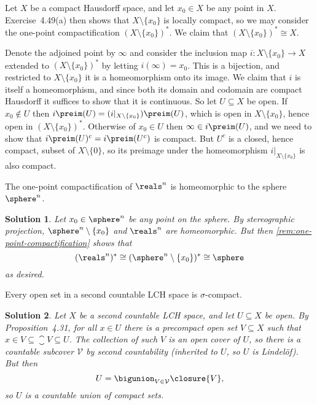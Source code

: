 \documentclass[article, a4paper, 11pt, oneside]{memoir}
\numberwithin{equation}{chapter}
\newcommand{\calV}{\mathcal{V}}
\theoremstyle{nonumberplain}
\newtheorem{solution}{Solution}
\begin{document}
\begin{remark}
	\label{rem:one-point-compactification}
	Let $X$ be a compact Hausdorff space, and let $x_0 \in X$ be any point in $X$. Exercise~4.49(a) then shows that $X \setminus \{x_0\}$ is locally compact, so we may consider the one-point compactification $(X \setminus \{x_0\})^*$. We claim that $(X \setminus \{x_0\})^* \cong X$.
	
	Denote the adjoined point by $\infty$ and consider the inclusion map $i \colon X \setminus \{x_0\} \to X$ extended to $(X \setminus \{x_0\})^*$ by letting $i(\infty) = x_0$. This is a bijection, and restricted to $X \setminus \{x_0\}$ it is a homeomorphism onto its image. We claim that $i$ is itself a homeomorphism, and since both its domain and codomain are compact Hausdorff it suffices to show that it is continuous. So let $U \subseteq X$ be open. If $x_0 \not\in U$ then $i\preim(U) = (i|_{X \setminus \{x_0\}})\preim(U)$, which is open in $X \setminus \{x_0\}$, hence open in $(X \setminus \{x_0\})^*$. Otherwise of $x_0 \in U$ then $\infty \in i\preim(U)$, and we need to show that $i\preim(U)^c = i\preim(U^c)$ is compact. But $U^c$ is a closed, hence compact, subset of $X \setminus \{0\}$, so its preimage under the homeomorphism $i|_{X \setminus \{x_0\}}$ is also compact.
\end{remark}


\begin{exerciseframed*}[52]
	The one-point compactification of $\reals^n$ is homeomorphic to the sphere $\sphere^n$.
\end{exerciseframed*}

\begin{solution}
	Let $x_0 \in \sphere^n$ be any point on the sphere. By stereographic projection, $\sphere^n \setminus \{x_0\}$ and $\reals^n$ are homeomorphic. But then \cref{rem:one-point-compactification} shows that
	\begin{equation*}
		(\reals^n)^*
			\cong (\sphere^n \setminus \{x_0\})^*
			\cong \sphere
	\end{equation*}
	as desired.
\end{solution}


\begin{exerciseframed*}[55]
	Every open set in a second countable LCH space is $\sigma$-compact.
\end{exerciseframed*}

\begin{solution}
	Let $X$ be a second countable LCH space, and let $U \subseteq X$ be open. By Proposition~4.31, for all $x \in U$ there is a precompact open set $V \subseteq X$ such that $x \in V \subseteq \closure{V} \subseteq U$. The collection of such $V$ is an open cover of $U$, so there is a countable subcover $\calV$ by second countability (inherited to $U$, so $U$ is Lindelöf). But then
	\begin{equation*}
		U
			= \bigunion_{V \in \calV} \closure{V},
	\end{equation*}
	so $U$ is a countable union of compact sets.
\end{solution}
\end{document}
